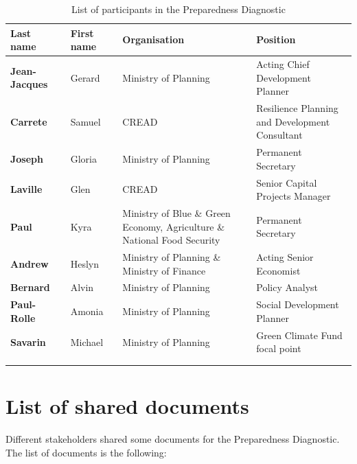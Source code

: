 \documentclass[
  10pt,
]{book}
\begin{document}
\begin{table}

\caption{\label{tab:unnamed-chunk-14}List of participants in the Preparedness Diagnostic}
\centering
\fontsize{15}{17}\selectfont
\begin{tabu} to 
\hline
Last name  & First name  & Organisation  & Position \\
\hline
\textbf{Jean-Jacques } & Gerard  & Ministry of Planning  & Acting Chief Development Planner \\
\hline
\textbf{Carrete } & Samuel  & CREAD  & Resilience Planning and Development Consultant \\
\hline
\textbf{Joseph } & Gloria  & Ministry of Planning  & Permanent Secretary \\
\hline
\textbf{Laville } & Glen  & CREAD  & Senior Capital Projects Manager \\
\hline
\textbf{Paul } & Kyra  & Ministry of Blue \& Green Economy, Agriculture \& National Food Security  & Permanent Secretary \\
\hline
\textbf{Andrew } & Heslyn  & Ministry of Planning \& Ministry of Finance  & Acting Senior Economist \\
\hline
\textbf{Bernard } & Alvin  & Ministry of Planning  & Policy Analyst \\
\hline
\textbf{Paul-Rolle } & Amonia  & Ministry of Planning  & Social Development Planner \\
\hline
\textbf{Savarin } & Michael  & Ministry of Planning  & Green Climate Fund focal point \\
\hline
{}\\
\\
\end{tabu}
\end{table}

\hypertarget{appendixE}{%
\chapter{List of shared documents}\label{appendixE}}

Different stakeholders shared some documents for the Preparedness Diagnostic. The list of documents is the following:
\end{document}
